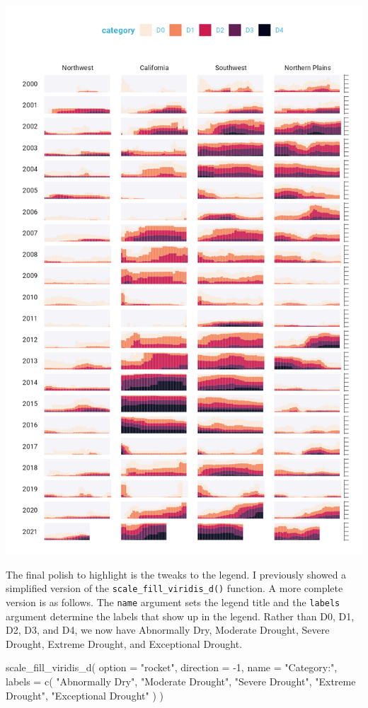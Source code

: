 \documentclass[
]{book}
\newenvironment{Shaded}{\begin{snugshade}}{\end{snugshade}}
\newcommand{\AttributeTok}[1]{\textcolor[rgb]{0.77,0.63,0.00}{#1}}
\newcommand{\DecValTok}[1]{\textcolor[rgb]{0.00,0.00,0.81}{#1}}
\newcommand{\FunctionTok}[1]{\textcolor[rgb]{0.00,0.00,0.00}{#1}}
\newcommand{\NormalTok}[1]{#1}
\newcommand{\SpecialCharTok}[1]{\textcolor[rgb]{0.00,0.00,0.00}{#1}}
\newcommand{\StringTok}[1]{\textcolor[rgb]{0.31,0.60,0.02}{#1}}
\begin{document}
\includegraphics[width=1\linewidth]{data-viz_files/figure-latex/unnamed-chunk-45-1}

The final polish to highlight is the tweaks to the legend. I previously showed a simplified version of the \texttt{scale\_fill\_viridis\_d()} function. A more complete version is as follows. The \texttt{name} argument sets the legend title and the \texttt{labels} argument determine the labels that show up in the legend. Rather than D0, D1, D2, D3, and D4, we now have Abnormally Dry, Moderate Drought, Severe Drought, Extreme Drought, and Exceptional Drought.

\begin{Shaded}
\begin{Highlighting}[]
\FunctionTok{scale\_fill\_viridis\_d}\NormalTok{(}
  \AttributeTok{option =} \StringTok{"rocket"}\NormalTok{,}
  \AttributeTok{direction =} \SpecialCharTok{{-}}\DecValTok{1}\NormalTok{,}
  \AttributeTok{name =} \StringTok{"Category:"}\NormalTok{,}
  \AttributeTok{labels =} \FunctionTok{c}\NormalTok{(}
    \StringTok{"Abnormally Dry"}\NormalTok{,}
    \StringTok{"Moderate Drought"}\NormalTok{,}
    \StringTok{"Severe Drought"}\NormalTok{,}
    \StringTok{"Extreme Drought"}\NormalTok{,}
    \StringTok{"Exceptional Drought"}
\NormalTok{  )}
\NormalTok{)}
\end{Highlighting}
\end{Shaded}
\end{document}
